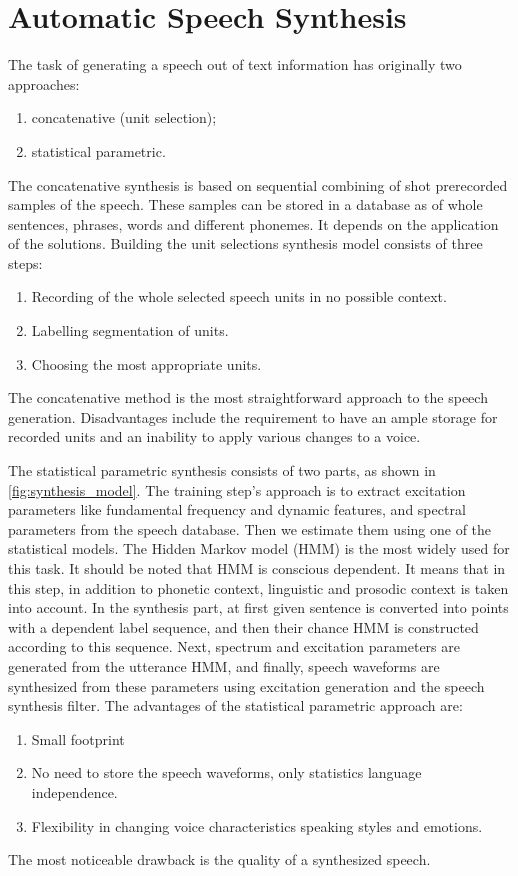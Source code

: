 \section{Automatic Speech Synthesis}

The task of generating a speech out of text information has originally two approaches:
\begin{enumerate}
    \item concatenative (unit selection);
    \item statistical parametric.
\end{enumerate}

The concatenative synthesis is based on sequential combining of shot prerecorded samples of the speech. These samples can be stored in a database as of whole sentences, phrases, words and different phonemes. It depends on the application of the solutions. Building the unit selections synthesis model consists of three steps:

\begin{enumerate}
    \item Recording of the whole selected speech units in no possible context.
    \item Labelling segmentation of units.
    \item Choosing the most appropriate units. 
\end{enumerate}

The concatenative method is the most straightforward approach to the speech generation. Disadvantages include the requirement to have an ample storage for recorded units and an inability to apply various changes to a voice.

The statistical parametric synthesis consists of two parts, as shown in \cref{fig:synthesis_model}. The training step's approach is to extract excitation parameters like fundamental frequency and dynamic features, and spectral parameters from the speech database. Then we estimate them using one of the statistical models. The Hidden Markov model (HMM) is the most widely used for this task. It should be noted that HMM is conscious dependent. It means that in this step, in addition to phonetic context, linguistic and prosodic context is taken into account. In the synthesis part, at first given sentence is converted into points with a dependent label sequence, and then their chance HMM is constructed according to this sequence. Next, spectrum and excitation parameters are generated from the utterance HMM, and finally, speech waveforms are synthesized from these parameters using excitation generation and the speech synthesis filter. The advantages of the statistical parametric approach are:
\begin{enumerate}
    \item Small footprint
    \item No need to store the speech waveforms, only statistics language independence.
    \item Flexibility in changing voice characteristics speaking styles and emotions.
\end{enumerate}
The most noticeable drawback is the quality of a synthesized speech.

